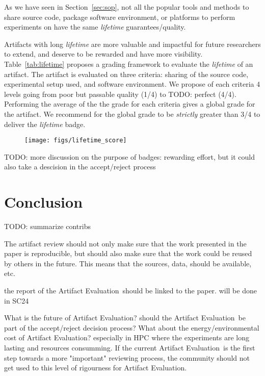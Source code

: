 \documentclass[sigconf,natbib=false]{acmart}
\newcommand{\aeval}{Artifact Evaluation}
\newcommand{\todo}[1]{{\color{red}TODO: #1}}
\begin{document}
As we have seen in Section\ \ref{sec:sop}, not all the popular tools and methods to share source code, package software environment, or platforms to perform experiments on have the same \emph{lifetime} guarantees/quality.

Artifacts with long \emph{lifetime} are more valuable and impactful for future researchers to extend, and deserve to be rewarded and have more visibility.
Table\ \ref{tab:lifetime} proposes a grading framework to evaluate the \emph{lifetime} of an artifact.
The artifact is evaluated on three criteria: sharing of the source code, experimental setup used, and software environment. 
We propose of each criteria 4 levels going from poor but passable quality (1/4) to \todo{perfect} (4/4).
Performing the average of the the grade for each criteria gives a global grade for the artifact.
We recommend for the global grade to be \emph{strictly} greater than 3/4 to deliver the \emph{lifetime} badge.


\begin{figure}
  \centering
    \texttt{[image: figs/lifetime\_score]}
  \caption{}\label{fig:}
\end{figure}

\todo{more discussion on the purpose of badges: rewarding effort, but it could also take a descision in the accept/reject process}


\section{Conclusion}

\todo{summarize contribs}

The artifact review should not only make sure that the work presented in the paper is reproducible, but should also make sure that the work could be reused by others in the future.
This means that the sources, data, should be available, etc.

the report of the \aeval\ should be linked to the paper.
will be done in SC24

What is the future of \aeval?
should the \aeval\ be part of the accept/reject decision process?
What about the energy/environmental cost of \aeval?
especially in HPC where the experiments are long lasting and resources consumming.
If the current \aeval\ is the first step towards a more "important" reviewing process, the community should not get used to this level of rigourness for \aeval.
\end{document}
